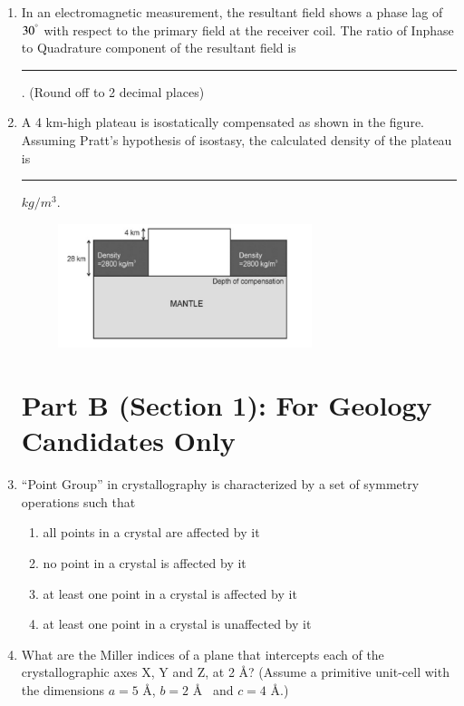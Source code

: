 \documentclass[journal,12pt,onecolumn]{IEEEtran}
\begin{document}
\begin{enumerate}
\item In an electromagnetic measurement, the resultant field shows a phase lag of $30^{\degree}$ with respect to the primary field at the receiver coil. The ratio of Inphase to Quadrature component of the resultant field is \rule{1cm}{0.15mm}. (Round off to 2 decimal places)

\hfill{}

\item A 4 km-high plateau is isostatically compensated as shown in the figure. Assuming Pratt's hypothesis of isostasy, the calculated density of the plateau is \rule{1cm}{0.15mm} $kg/m^{3}$.

\hfill{}
\begin{figure}[h!]
    \centering
    \includegraphics[width=0.7\textwidth]{figs/fig7.png}
    \caption{}
    \label{fig:partA_q25}
\end{figure}



\newpage
\section*{Part B (Section 1): For Geology Candidates Only}



\item ``Point Group'' in crystallography is characterized by a set of symmetry operations such that

\hfill{}
\begin{enumerate}
    \item all points in a crystal are affected by it
    \item no point in a crystal is affected by it
    \item at least one point in a crystal is affected by it
    \item at least one point in a crystal is unaffected by it
\end{enumerate}

\item What are the Miller indices of a plane that intercepts each of the crystallographic axes X, Y and Z, at 2 \AA? (Assume a primitive unit-cell with the dimensions $a=5$ \AA, $b=2$ \AA~ and $c=4$ \AA.)


\end{enumerate}
\end{document}
